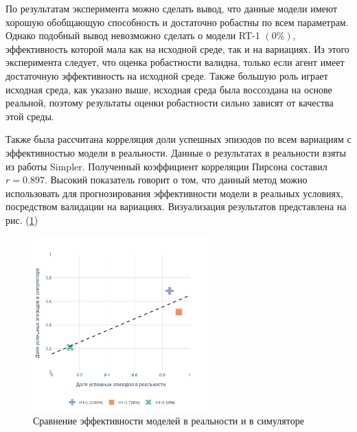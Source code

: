             По результатам эксперимента можно сделать вывод, что данные модели имеют хорошую обобщающую способность и достаточно робастны по всем параметрам. Однако подобный вывод невозможно сделать о модели RT-1 $(0\%)$, эффективность которой мала как на исходной среде, так и на вариациях. Из этого эксперимента следует, что оценка робастности валидна, только если агент имеет достаточную эффективность на исходной среде. Также большую роль играет исходная среда, как указано выше, исходная среда была воссоздана на основе реальной, поэтому результаты оценки робастности сильно зависят от качества этой среды.

            Также была рассчитана корреляция доли успешных эпизодов по всем вариациям с эффективностью модели в реальности. Данные о результатах в реальности взяты из работы Simpler. Полученный коэффициент корреляции Пирсона составил $r = 0.897$. Высокий показатель говорит о том, что данный метод можно использовать для прогнозирования эффективности модели в реальных условиях, посредством валидации на вариациях. Визуализация результатов представлена на рис. (\ref{fig:res})

            \begin{figure}
              \begin{center}
                  \includegraphics[width=0.6\textwidth]{images/plot.png}
              \caption{Сравнение эффективности моделей в реальности и в симуляторе}
              \label{fig:res}
              \end{center}
          \end{figure}